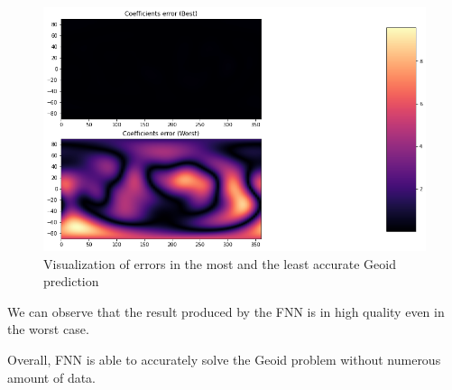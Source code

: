 \begin{figure}[H]
    \caption{Visualization of errors in the most and the least accurate Geoid prediction}
    \includegraphics[scale=0.4]{figures/geoid_images/Geoid_Errors.png}
\end{figure}

We can observe that the result produced by the FNN is in high quality even in the worst case.

Overall, FNN is able to accurately solve the Geoid problem without numerous amount of data.


